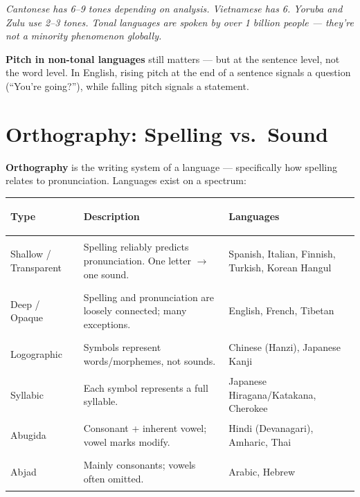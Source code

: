 \documentclass[11pt, letterpaper]{article}
\begin{document}
\textit{Cantonese has 6--9 tones depending on analysis. Vietnamese has 6. Yoruba and Zulu use 2--3 tones. Tonal languages are spoken by over 1 billion people --- they're not a minority phenomenon globally.}

\textbf{Pitch in non-tonal languages} still matters --- but at the sentence level, not the word level. In English, rising pitch at the end of a sentence signals a question (``You're going?''), while falling pitch signals a statement.

\section*{Orthography: Spelling vs.\ Sound}

\textbf{Orthography} is the writing system of a language --- specifically how spelling relates to pronunciation. Languages exist on a spectrum:

\noindent
{\renewcommand{\arraystretch}{1.6}
\begin{tabularx}{\textwidth}{>{\bfseries\raggedright\arraybackslash}p{3.5cm}
                              >{\raggedright\arraybackslash}X
                              >{\raggedright\arraybackslash}p{3.5cm}}
\toprule
\rowcolor{tableheaderteal}
\textbf{Type} & \textbf{Description} & \textbf{Languages} \\
\midrule
\rowcolor{rowTe} Shallow / Transparent & Spelling reliably predicts pronunciation. One letter $\to$ one sound. & Spanish, Italian, Finnish, Turkish, Korean Hangul \\
\rowcolor{rowA}  Deep / Opaque         & Spelling and pronunciation are loosely connected; many exceptions. & English, French, Tibetan \\
\rowcolor{rowTe} Logographic           & Symbols represent words/morphemes, not sounds.                      & Chinese (Hanzi), Japanese Kanji \\
\rowcolor{rowA}  Syllabic              & Each symbol represents a full syllable.                             & Japanese Hiragana/Katakana, Cherokee \\
\rowcolor{rowTe} Abugida               & Consonant + inherent vowel; vowel marks modify.                     & Hindi (Devanagari), Amharic, Thai \\
\rowcolor{rowA}  Abjad                 & Mainly consonants; vowels often omitted.                            & Arabic, Hebrew \\
\bottomrule
\end{tabularx}}
\end{document}

